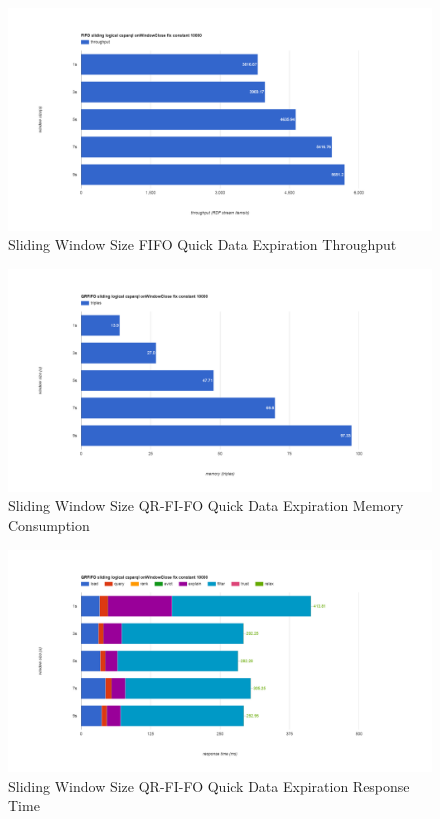 \begin{figure}[!htbp]
    \centering
    \includegraphics[width=\textwidth]{img/app3-slide-ws-fifo-quick-t.png}
    \caption{Sliding Window Size FIFO Quick Data Expiration Throughput}
\end{figure}
\begin{figure}[!htbp]
    \centering
    \includegraphics[width=\textwidth]{img/app3-slide-ws-qrfifo-quick-m.png}
    \caption{Sliding Window Size QR-FI-FO Quick Data Expiration Memory Consumption}
\end{figure}
\begin{figure}[!htbp]
    \centering
    \includegraphics[width=\textwidth]{img/app3-slide-ws-qrfifo-quick-r.png}
    \caption{Sliding Window Size QR-FI-FO Quick Data Expiration Response Time}
\end{figure}
